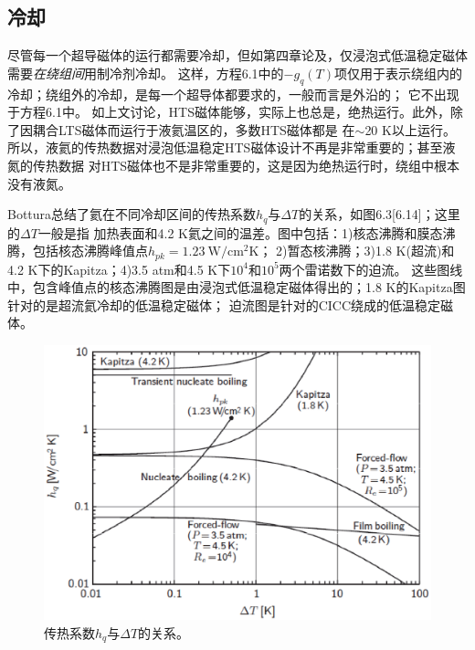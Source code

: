 \subsection{冷却}
尽管每一个超导磁体的运行都需要冷却，但如第四章论及，仅浸泡式低温稳定磁体需要\emph{在绕组间}用制冷剂冷却。
这样，方程6.1中的$-g_q(T)$项仅用于表示绕组内的冷却；绕组外的冷却，是每一个超导体都要求的，一般而言是外沿的；
它不出现于方程6.1中。
如上文讨论，HTS磁体能够，实际上也总是，绝热运行。此外，除了因耦合LTS磁体而运行于液氦温区的，多数HTS磁体都是
在$\sim$20 K以上运行。所以，液氦的传热数据对浸泡低温稳定HTS磁体设计不再是非常重要的；甚至液氮的传热数据
对HTS磁体也不是非常重要的，这是因为绝热运行时，绕组中根本没有液氮。

Bottura总结了氦在不同冷却区间的传热系数$h_q$与$\Delta T$的关系，如图6.3[6.14]；这里的$\Delta T$一般是指
加热表面和4.2 K氦之间的温差。图中包括：1)核态沸腾和膜态沸腾，包括核态沸腾峰值点$h_{pk}=1.23\ \mathrm{W/cm^2 K}$；
2)暂态核沸腾；3)1.8 K(超流)和4.2 K下的Kapitza；4)3.5 atm和4.5 K下$10^4$和$10^5$两个雷诺数下的迫流。
这些图线中，包含峰值点的核态沸腾图是由浸泡式低温稳定磁体得出的；1.8 K的Kapitza图针对的是超流氦冷却的低温稳定磁体；
迫流图是针对的CICC绕成的低温稳定磁体。
\begin{figure}[htbp]
	\centering
	\includegraphics[scale=0.6]{chpt6/figs/fig6.3.eps}
	\caption{传热系数$h_q$与$\Delta T$的关系。}
\end{figure}

